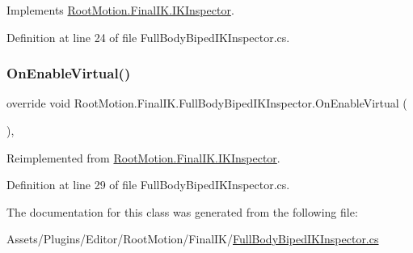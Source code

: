 Implements \mbox{\hyperlink{class_root_motion_1_1_final_i_k_1_1_i_k_inspector_a4c4528d5f5ce9af9e30c049138a5a5ca}{Root\+Motion.\+Final\+I\+K.\+I\+K\+Inspector}}.



Definition at line 24 of file Full\+Body\+Biped\+I\+K\+Inspector.\+cs.

\mbox{\label{class_root_motion_1_1_final_i_k_1_1_full_body_biped_i_k_inspector_aabfeb6f3917b1ba7fb58725b9ea11a3a}} 
\subsubsection{\texorpdfstring{On\+Enable\+Virtual()}{OnEnableVirtual()}}
{\footnotesize\ttfamily override void Root\+Motion.\+Final\+I\+K.\+Full\+Body\+Biped\+I\+K\+Inspector.\+On\+Enable\+Virtual (\begin{DoxyParamCaption}{ }\end{DoxyParamCaption})\hspace{0.3cm}{\ttfamily [protected]}, {\ttfamily [virtual]}}



Reimplemented from \mbox{\hyperlink{class_root_motion_1_1_final_i_k_1_1_i_k_inspector_a462bc6acec264d59597f3c6a211f179f}{Root\+Motion.\+Final\+I\+K.\+I\+K\+Inspector}}.



Definition at line 29 of file Full\+Body\+Biped\+I\+K\+Inspector.\+cs.



The documentation for this class was generated from the following file\+:\begin{DoxyCompactItemize}
\item 
Assets/\+Plugins/\+Editor/\+Root\+Motion/\+Final\+I\+K/\mbox{\hyperlink{_full_body_biped_i_k_inspector_8cs}{Full\+Body\+Biped\+I\+K\+Inspector.\+cs}}\end{DoxyCompactItemize}
